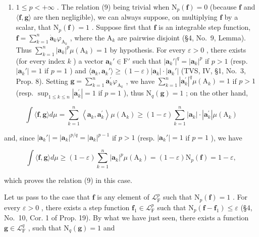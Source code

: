 \begin{enumerate}
\def\labelenumi{(\roman{enumi})}
\tightlist
\item
  \(1 \leqslant p < +\infty\) . The relation (9) being trivial when \(\mathrm{N}_p(\mathbf{f}) = 0\) (because \(\mathbf{f}\) and \(\langle \mathbf{f}, \mathbf{g} \rangle\) are then negligible), we can always suppose, on multiplying \(\mathbf{f}\) by a scalar, that \(\mathrm{N}_p(\mathbf{f}) = 1\) . Suppose first that \(\mathbf{f}\) is an integrable step function, \(\mathbf{f} = \sum_{k=1}^{n} \dot{\mathbf{a}}_k \varphi_{\mathrm{A}_k}\) , where the \(\mathrm{A}_k\) are pairwise disjoint (§4, No.~9, Lemma). Thus \(\sum_{k=1}^{n} |\mathbf{a}_k|^p \mu(\mathrm{A}_k) = 1\) by hypothesis. For every \(\varepsilon > 0\) , there exists (for every index \(k\) ) a vector \(\mathbf{a}_k' \in \mathrm{F}'\) such that \(|\mathbf{a}_k'|^q = |\mathbf{a}_k|^p\) if \(p > 1\) (resp. \(|\mathbf{a}_k'| = 1\) if \(p = 1\) ) and \(\langle \mathbf{a}_k, \mathbf{a}_k' \rangle \geqslant (1 - \varepsilon) |\mathbf{a}_k| \cdot |\mathbf{a}_k'|\) (TVS, IV, §1, No.~3, Prop. 8). Setting \(\mathbf{g} = \sum_{k=1}^{n} \mathbf{a}_{k}^{\prime} \varphi_{\mathrm{A}_{k}}\) , we have \(\sum_{k=1}^{n} |\mathbf{a}_{k}^{\prime}|^{q} \mu(\mathrm{A}_{k}) = 1\) if \(p > 1\) (resp. \(\sup_{1 \leqslant k \leqslant n} |\mathbf{a}_{k}^{\prime}| = 1\) if \(p = 1\) ), thus \(\mathrm{N}_{q}(\mathbf{g}) = 1\) ; on the other hand,
\end{enumerate}

\[
\int \langle \mathbf {f}, \mathbf {g} \rangle d \mu = \sum_ {k = 1} ^ {n} \left\langle \mathbf {a} _ {k}, \mathbf {a} _ {k} ^ {\prime} \right\rangle \mu \left(\mathrm{A} _ {k}\right) \geqslant (1 - \varepsilon) \sum_ {k = 1} ^ {n} | \mathbf {a} _ {k} | \cdot | \mathbf {a} _ {k} ^ {\prime} | \mu (\mathrm{A} _ {k})
\]

and, since \(|\mathbf{a}_k'| = |\mathbf{a}_k|^{p / q} = |\mathbf{a}_k|^{p - 1}\) if \(p > 1\) (resp. \(|\mathbf{a}_k'| = 1\) if \(p = 1\) ), we have

\[
\int \langle \mathbf {f}, \mathbf {g} \rangle d \mu \geqslant (1 - \varepsilon) \sum_ {k = 1} ^ {n} | \mathbf {a} _ {k} | ^ {p} \mu (\mathrm{A} _ {k}) = (1 - \varepsilon) \mathrm{N} _ {p} (\mathbf {f}) = 1 - \varepsilon ,
\]

which proves the relation (9) in this case.

Let us pass to the case that \(\mathbf{f}\) is any element of \(\mathcal{L}_{\mathrm{F}}^{p}\) such that \(\mathrm{N}_p(\mathbf{f}) = 1\) . For every \(\varepsilon > 0\) , there exists a step function \(\mathbf{f}_1 \in \mathcal{L}_{\mathrm{F}}^p\) such that \(\mathrm{N}_p(\mathbf{f} - \mathbf{f}_1) \leqslant \varepsilon\) (§4, No.~10, Cor. 1 of Prop. 19). By what we have just seen, there exists a function \(\mathbf{g} \in \mathcal{L}_{\mathrm{F}}^q\) , such that \(\mathrm{N}_q(\mathbf{g}) = 1\) and

